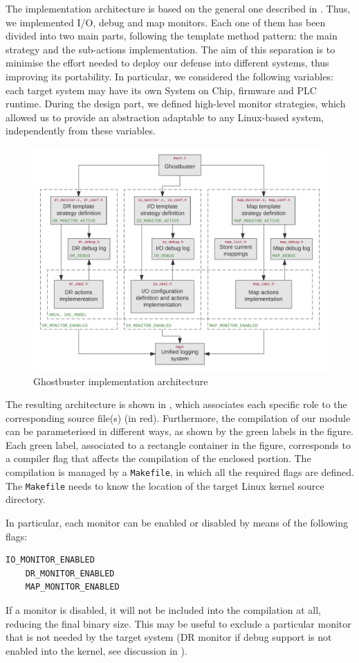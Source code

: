 The implementation architecture is based on the general one described in . Thus, we implemented I/O, debug and map monitors.
Each one of them has been divided into two main parts, following the template method pattern: the main strategy and the sub-actions implementation.
The aim of this separation is to minimise the effort needed to deploy our defense into different systems, thus improving its portability.
In particular, we considered the following variables: each target system may have its own System on Chip, firmware and PLC runtime.
During the design part, we defined high-level monitor strategies, which allowed us to provide an abstraction adaptable to any Linux-based system,
independently from these variables.
\begin{figure}[h]
\centerline{\includegraphics[width=\textwidth]{res/def-impl}}
\caption{Ghostbuster implementation architecture \label{fig:def-impl}}
\end{figure}
The resulting architecture is shown in , which associates each specific role to the corresponding
source file(s) (in red).
Furthermore, the compilation of our module can be parameterised in different ways, as shown by the green labels in the figure.
Each green label, associated to a rectangle container in the figure, corresponds to a compiler flag that affects the compilation of the enclosed portion.
The compilation is managed by a \verb|Makefile|, in which all the required flags are defined.
The \verb|Makefile| needs to know the location of the target Linux kernel source directory.

In particular, each monitor can be enabled or disabled by means of the following flags:
\begin{Verbatim}[fontsize=\small]
	IO_MONITOR_ENABLED
	DR_MONITOR_ENABLED
	MAP_MONITOR_ENABLED
\end{Verbatim}
If a monitor is disabled, it will not be included into the compilation at all, reducing the final binary size.
This may be useful to exclude a particular monitor that is not needed by the target system
(\eg DR monitor if debug support is not enabled into the kernel, see discussion in ).

